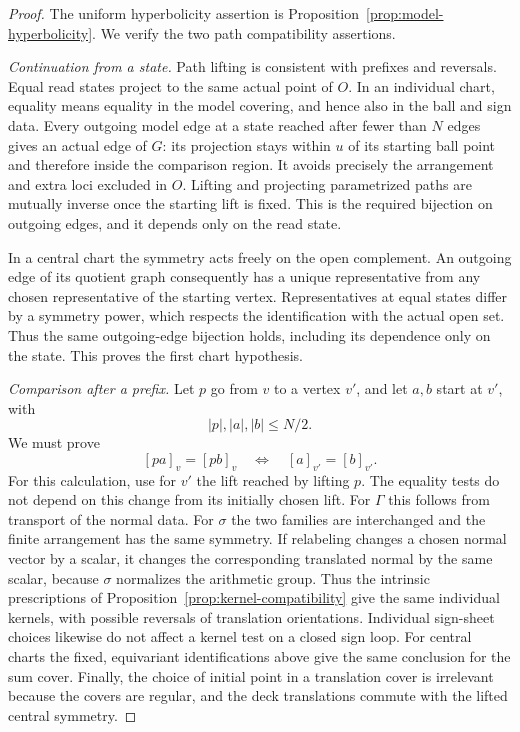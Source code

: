 \documentclass[11pt,reqno]{amsart}
\numberwithin{equation}{section}
\theoremstyle{definition}
\theoremstyle{remark}
\begin{document}
\begin{proof}
The uniform hyperbolicity assertion is
Proposition~\ref{prop:model-hyperbolicity}.  We verify the two path
compatibility assertions.

\emph{Continuation from a state.}
Path lifting is consistent with prefixes and reversals.  Equal read
states project to the same actual point of $O$.  In an individual
chart, equality means equality in the model covering, and hence also
in the ball and sign data.  Every outgoing model edge at a state
reached after fewer than $N$ edges gives an actual edge of $G$: its
projection stays within $u$ of its starting ball point and therefore
inside the comparison region.  It avoids precisely the arrangement
and extra loci excluded in $O$.  Lifting and projecting parametrized
paths are mutually inverse once the starting lift is fixed.  This is
the required bijection on outgoing edges, and it depends only on the
read state.

In a central chart the symmetry acts freely on the open complement.
An outgoing edge of its quotient graph consequently has a unique
representative from any chosen representative of the starting
vertex.  Representatives at equal states differ by a symmetry power,
which respects the identification with the actual open set.  Thus the
same outgoing-edge bijection holds, including its dependence only on
the state.  This proves the first chart hypothesis.

\emph{Comparison after a prefix.}
Let $p$ go from $v$ to a vertex $v'$, and let $a,b$ start at $v'$,
with
\[
 |p|,|a|,|b|\le N/2.
\]
We must prove
\begin{equation}\label{app:prefix-compatibility}
 [pa]_v=[pb]_v\quad\Longleftrightarrow\quad[a]_{v'}=[b]_{v'}.
\end{equation}
For this calculation, use for $v'$ the lift reached by lifting $p$.
The equality tests do not depend on this change from its initially
chosen lift.  For $\Gamma$ this follows from transport of the normal
data.  For $\sigma$ the two families are interchanged and the finite
arrangement has the same symmetry.  If relabeling changes a chosen
normal vector by a scalar, it changes the corresponding translated
normal by the same scalar, because $\sigma$ normalizes the
arithmetic group.  Thus the intrinsic prescriptions of
Proposition~\ref{prop:kernel-compatibility} give the same individual
kernels, with possible reversals of translation orientations.
Individual sign-sheet choices likewise do not affect a kernel test
on a closed sign loop.  For central charts the fixed, equivariant
identifications above give the same conclusion for the sum cover.
Finally, the choice of initial point in a translation cover is
irrelevant because the covers are regular, and the deck translations
commute with the lifted central symmetry.


\end{proof}
\end{document}
